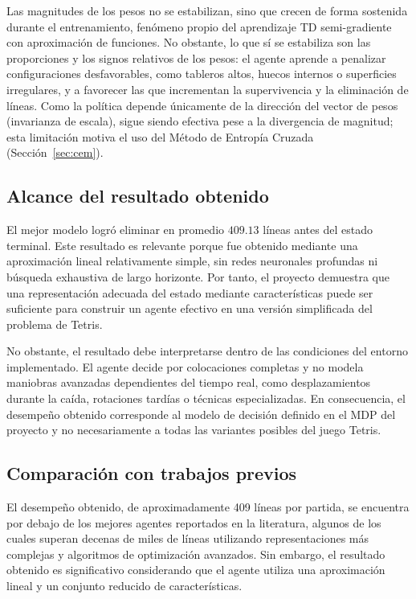 Las magnitudes de los pesos no se estabilizan, sino que crecen de forma sostenida durante el entrenamiento, fenómeno propio del aprendizaje TD semi-gradiente con aproximación de funciones. No obstante, lo que sí se estabiliza son las proporciones y los signos relativos de los pesos: el agente aprende a penalizar configuraciones desfavorables, como tableros altos, huecos internos o superficies irregulares, y a favorecer las que incrementan la supervivencia y la eliminación de líneas. Como la política depende únicamente de la dirección del vector de pesos (invarianza de escala), sigue siendo efectiva pese a la divergencia de magnitud; esta limitación motiva el uso del Método de Entropía Cruzada (Sección~\ref{sec:cem}).

\subsection{Alcance del resultado obtenido}

El mejor modelo logró eliminar en promedio $409.13$ líneas antes del estado terminal. Este resultado es relevante porque fue obtenido mediante una aproximación lineal relativamente simple, sin redes neuronales profundas ni búsqueda exhaustiva de largo horizonte. Por tanto, el proyecto demuestra que una representación adecuada del estado mediante características puede ser suficiente para construir un agente efectivo en una versión simplificada del problema de Tetris.

No obstante, el resultado debe interpretarse dentro de las condiciones del entorno implementado. El agente decide por colocaciones completas y no modela maniobras avanzadas dependientes del tiempo real, como desplazamientos durante la caída, rotaciones tardías o técnicas especializadas. En consecuencia, el desempeño obtenido corresponde al modelo de decisión definido en el MDP del proyecto y no necesariamente a todas las variantes posibles del juego Tetris.

\subsection{Comparación con trabajos previos}
El desempeño obtenido, de aproximadamente 409 líneas por partida, se encuentra por debajo de los mejores agentes reportados en la literatura, algunos de los cuales superan decenas de miles de líneas utilizando representaciones más complejas y algoritmos de optimización avanzados. Sin embargo, el resultado obtenido es significativo considerando que el agente utiliza una aproximación lineal y un conjunto reducido de características.

